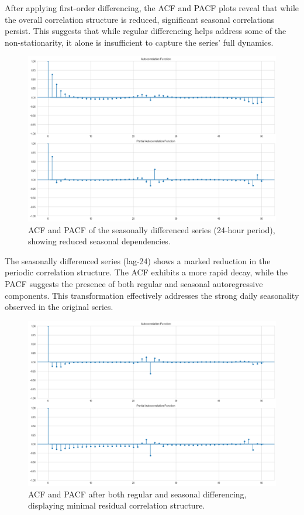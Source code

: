 \documentclass{article}
\begin{document}
After applying first-order differencing, the ACF and PACF plots reveal that while the overall correlation structure is reduced, significant seasonal correlations persist. This suggests that while regular differencing helps address some of the non-stationarity, it alone is insufficient to capture the series' full dynamics.

\begin{figure}[htbp]
    \centering
    \includegraphics[width=\textwidth]{acf_pacf_seasonal}
    \caption{ACF and PACF of the seasonally differenced series (24-hour period), showing reduced seasonal dependencies.}
    \label{fig:acf_seasonal}
\end{figure}

The seasonally differenced series (lag-24) shows a marked reduction in the periodic correlation structure. The ACF exhibits a more rapid decay, while the PACF suggests the presence of both regular and seasonal autoregressive components. This transformation effectively addresses the strong daily seasonality observed in the original series.

\begin{figure}[htbp]
    \centering
    \includegraphics[width=\textwidth]{acf_pacf_both}
    \caption{ACF and PACF after both regular and seasonal differencing, displaying minimal residual correlation structure.}
    \label{fig:acf_both}
\end{figure}
\end{document}
